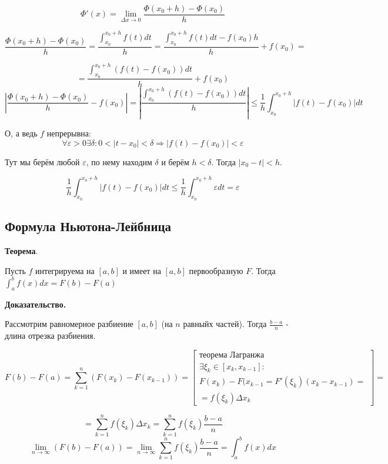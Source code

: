 \documentclass[a4paper]{article}
\begin{document}
\begin{definit}
\begin{hproof}
\[
\Phi'(x) = \lim_{\Delta x \rightarrow 0} \frac{\Phi(x_0 + h) - \Phi(x_0)}{h}
\]

\[
 \frac{\Phi(x_0 + h) - \Phi(x_0)}{h} = \frac{\int_{x_0}^{x_0+h} f(t)dt}{h} = \frac{\int_{x_0}^{x_0+h} f(t)dt - f(x_0)h}{h} + f(x_0) = 
\]

\[
 = \frac{\int_{x_0}^{x_0+h} (f(t) - f(x_0))dt}{h} + f(x_0)
\]
\[
\left|  \frac{\Phi(x_0 + h) - \Phi(x_0)}{h} - f(x_0) \right| = \left| \frac{\int_{x_0}^{x_0+h} (f(t) - f(x_0))dt}{h} \right| \leq \frac{1}{h} \int_{x_0}^{x_0+h} |f(t) - f(x_0)|dt
\]

О, а ведь $f$ непрерывна: 
\[
\forall \varepsilon > 0 \exists \delta: 0<|t-x_0|<\delta \Rightarrow |f(t) - f(x_0)| < \varepsilon
\]

Тут мы берём любой $\varepsilon$, по нему находим $\delta$ и берём $h < \delta$. Тогда $|x_0-t| < h$.


\[
\frac{1}{h} \int_{x_0}^{x_0+h} |f(t) - f(x_0)|dt \leq \frac{1}{h} \int_{x_0}^{x_0+h} \varepsilon dt = \varepsilon
\]
\end{hproof}


\end{definit}

\begin{definit}
\hypertarget{p13}{}
\subsection*{Формула Ньютона-Лейбница}

\begin{htheorem}\textbf{Теорема}.

Пусть $f$ интегрируема на $[a,b]$ и имеет на $[a,b]$ первообразную $F$. Тогда $\int_a^b f(x)dx = F(b) - F(a)$
\end{htheorem}

\begin{hproof}\textbf{Доказательство.}

Рассмотрим равномерное разбиение $[a,b]$ (на $n$ равныйх частей). Тогда $\frac{b-a}{n}$ - длина отрезка разбиения.

\[
F(b) - F(a) = \sum_{k=1}^n (F(x_k) - F(x_{k-1})) = \begin{bmatrix}
\text{теорема Лагранжа} \\
\exists \xi_k \in [x_k, x_{k-1}]: \\
F(x_k)-F(x_{k-1} = F'(\xi_k)(x_k-x_{k-1}) = \\ = f(\xi_k) \Delta x_k
\end{bmatrix} = 
\]

\[
 = \sum_{k=1}^n f(\xi_k) \Delta x_k = \sum_{k=1}^n f(\xi_k) \frac{b-a}{n}
\]
\[
\lim_{n \rightarrow \infty} (F(b)-F(a)) = \lim_{n \rightarrow \infty} \sum_{k=1}^n f(\xi_k) \frac{b-a}{n} = \int_a^b f(x)dx
\]
\end{hproof}

\end{definit}
\end{document}
